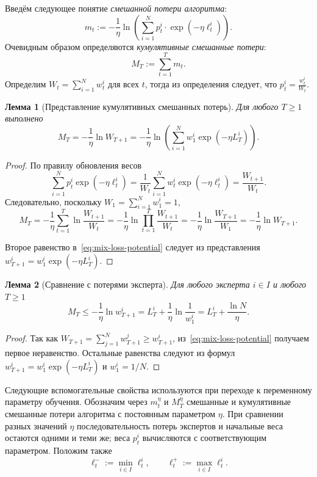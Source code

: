 \documentclass[a4paper,12pt]{article}
\theoremstyle{plain}
\newtheorem*{lemma}{Лемма}
\theoremstyle{definition}
\theoremstyle{remark}
\numberwithin{equation}{section}
\begin{document}
Введём следующее понятие \textit{смешанной потери алгоритма}:
\[m_t := -\frac{1}{\eta} \ln \left(\sum\limits_{i=1}^{N} p_t^i \cdot \exp \left(-\eta \ell_t^i\right)\right).\]
Очевидным образом определяются \textit{кумулятивные смешанные потери}:
\[M_T := \sum\limits_{t=1}^{T} m_t.\]
Определим $W_t = \sum\limits_{i=1}^{N}w_t^i$ для всех $t$, тогда из определения следует, что $p_t^i = \frac{w_t^i}{W_t}$.

\begin{lemma}[Представление кумулятивных смешанных потерь]
Для любого $T \geqslant 1$ выполнено
\begin{equation}
\label{eq:mix-loss-potential}
M_T = -\frac{1}{\eta}\ln W_{T+1}
    = -\frac{1}{\eta}\ln\left(
        \sum_{i=1}^{N} w_1^i \exp\left(-\eta L_T^i\right)
      \right).
\end{equation}
\end{lemma}

\begin{proof}
По правилу обновления весов
\[
\sum_{i=1}^{N} p_t^i \exp\left(-\eta\ell_t^i\right)
= \frac{1}{W_t}\sum_{i=1}^{N} w_t^i \exp\left(-\eta\ell_t^i\right)
= \frac{W_{t+1}}{W_t}.
\]
Следовательно, поскольку $W_1 = \sum_{i=1}^{N} w_1^i = 1$,
\[ 
 M_T
 = -\frac{1}{\eta}\sum_{t=1}^{T}\ln\frac{W_{t+1}}{W_t}
 = -\frac{1}{\eta}\ln\prod_{t=1}^{T}\frac{W_{t+1}}{W_t}
 = -\frac{1}{\eta}\ln\frac{W_{T+1}}{W_1}
 = -\frac{1}{\eta}\ln W_{T+1}.
 \]

Второе равенство в~\eqref{eq:mix-loss-potential} следует из представления
$w_{T+1}^i = w_1^i\exp\left(-\eta L_T^i\right)$.
\end{proof}

\begin{lemma}[Сравнение с потерями эксперта]
Для любого эксперта $i \in I$ и любого $T \geqslant 1$
\begin{equation}
\label{eq:mix-loss-expert}
M_T \leqslant -\frac{1}{\eta}\ln w_{T+1}^i
    = L_T^i + \frac{1}{\eta}\ln\frac{1}{w_1^i}
    = L_T^i + \frac{\ln N}{\eta}.
\end{equation}
\end{lemma}

\begin{proof}
Так как $W_{T+1} = \sum_{j=1}^{N} w_{T+1}^j \geqslant w_{T+1}^i$, из~\eqref{eq:mix-loss-potential} получаем первое неравенство. Остальные равенства следуют из формул $w_{T+1}^i = w_1^i\exp\left(-\eta L_T^i\right)$ и $w_1^i = 1/N$.
\end{proof}

Следующие вспомогательные свойства используются при переходе к переменному параметру обучения. Обозначим через $m_t^\eta$ и $M_T^\eta$ смешанные и кумулятивные смешанные потери алгоритма с постоянным параметром $\eta$. При сравнении разных значений $\eta$ последовательность потерь экспертов и начальные веса остаются одними и теми же; веса $p_t^i$ вычисляются с соответствующим параметром. Положим также
\[
\ell_t^- := \min_{i\in I}\ell_t^i,
\qquad
\ell_t^+ := \max_{i\in I}\ell_t^i.
\]
\end{document}
